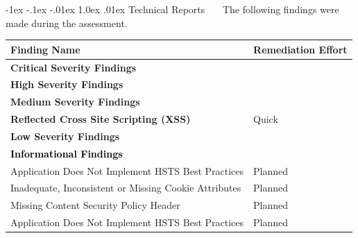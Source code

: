 \documentclass{article}
\makeatletter
\renewcommand{\section}{\@startsection{section}{1}{\z@}%
            {-1ex \@plus -.1ex \@minus -.01ex}%
            {1.0ex \@plus  .01ex}%
            {\normalfont\large\bfseries\color{sectioncolor}}}
\makeatother
\begin{document}
            
            \newpage
            \section{\large Technical Reports}
            \ \ \ The following findings were made during the assessment.    
            \begin{center}
                \begin{longtable}{|p{30em}|p{10em}|}
            \hline
            \textbf{Finding Name} & \textbf{Remediation Effort}  \\
            \hline
            \normalsize \textcolor{critical}{\textbf{Critical Severity Findings}} & \\
            \hline
            \multicolumn{2}{|p{20em}|}{\normalsize \textcolor{high}{\textbf{High Severity Findings}}} \\
            \hline
            \multicolumn{2}{|p{20em}|}{\normalsize \textcolor{medium}{\textbf{Medium Severity Findings}}} \\
            \hline
            \normalsize \textbf{Reflected Cross Site Scripting (XSS) } & {Quick}\\
            \hline
            \multicolumn{2}{|p{20em}|}{\normalsize \textcolor{low}{\textbf{Low Severity Findings}}} \\
            \hline
            \multicolumn{2}{|p{20em}|}{\normalsize \textcolor{infotext}{\textbf{Informational Findings}}} \\
            \hline
            
                    Application Does Not Implement HSTS Best Practices & Planned \\
                    \hline
                    Inadequate, Inconsistent or Missing Cookie Attributes & Planned \\
                    \hline
                    Missing Content Security Policy Header & Planned \\
                    \hline
                    Application Does Not Implement HSTS Best Practices & Planned \\
                    \hline\end{longtable}
            \end{center}  
            
                \newpage
\end{document}
